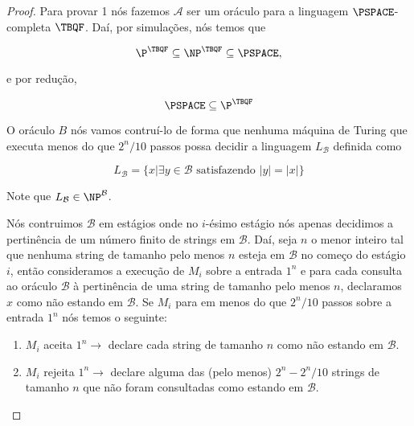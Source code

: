 \begin{proof}

Para provar 1 nós fazemos $\mathcal{A}$ ser um oráculo para a linguagem $\PSPACE$-completa $\TBQF$. Daí, por simulações, nós temos que

\begin{equation*}
	\P^{\TBQF} \subseteq \NP^{\TBQF} \subseteq \PSPACE,
\end{equation*}

e por redução,

\begin{equation*}
	\PSPACE \subseteq \P^{\TBQF}
\end{equation*}

O oráculo $B$ nós vamos contruí-lo de forma que nenhuma máquina de Turing que executa menos do que $2^{n}/10$ passos possa decidir a linguagem $L_{\mathcal{B}}$ definida como

\begin{equation*}
    L_{\mathcal{B}} = \{x \lvert \exists y \in \mathcal{B} \text{ satisfazendo } \lvert y \rvert = \lvert x \rvert \}
\end{equation*}

Note que $L_{\mathcal{B}} \in \NP^{\mathcal{B}}$.

Nós contruimos $\mathcal{B}$ em estágios onde no $i$-ésimo estágio nós apenas decidimos a pertinência de um número finito de strings em $\mathcal{B}$. Daí, seja $n$ o menor inteiro tal que nenhuma string de tamanho pelo menos $n$ esteja em $\mathcal{B}$ no começo do estágio $i$, então consideramos a execução de $M_{i}$ sobre a entrada $1^{n}$ e para cada consulta ao oráculo $\mathcal{B}$ à pertinência de uma string de tamanho pelo menos $n$, declaramos $x$ como não estando em $\mathcal{B}$. Se $M_{i}$ para em menos do que $2^{n}/10$ passos sobre a entrada $1^{n}$ nós temos o seguinte:

\begin{enumerate}

    \item $M_{i}$ aceita $1^{n} \rightarrow$ declare cada string de tamanho $n$ como não estando em $\mathcal{B}$.

    \item $M_{i}$ rejeita $1^{n} \rightarrow$ declare alguma das (pelo menos) $2^{n} - 2^{n}/10$ strings de tamanho $n$ que não foram consultadas como estando em $\mathcal{B}$.

\end{enumerate} 

\end{proof}

